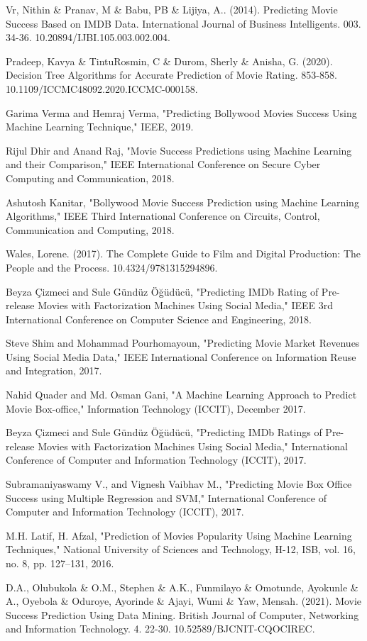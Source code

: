 \documentclass[conference]{IEEEtran}
\begin{document}
\begin{thebibliography}{1}
    Vr, Nithin \& Pranav, M \& Babu, PB \& Lijiya, A.. (2014). Predicting Movie Success Based on IMDB Data. International Journal of Business Intelligents. 003. 34-36. 10.20894/IJBI.105.003.002.004.

    Pradeep, Kavya \& TintuRosmin, C \& Durom, Sherly \& Anisha, G. (2020). Decision Tree Algorithms for Accurate Prediction of Movie Rating. 853-858. 10.1109/ICCMC48092.2020.ICCMC-000158.

    Garima Verma and Hemraj Verma, "Predicting Bollywood Movies Success Using Machine Learning Technique," IEEE, 2019.

    Rijul Dhir and Anand Raj, "Movie Success Predictions using Machine Learning and their Comparison," IEEE International Conference on Secure Cyber Computing and Communication, 2018.

    Ashutosh Kanitar, "Bollywood Movie Success Prediction using Machine Learning Algorithms," IEEE Third International Conference on Circuits, Control, Communication and Computing, 2018.

    Wales, Lorene. (2017). The Complete Guide to Film and Digital Production: The People and the Process. 10.4324/9781315294896.

    Beyza Çizmeci and Sule Gündüz Öğüdücü, "Predicting IMDb Rating of Pre-release Movies with Factorization Machines Using Social Media," IEEE 3rd International Conference on Computer Science and Engineering, 2018.

    Steve Shim and Mohammad Pourhomayoun, "Predicting Movie Market Revenues Using Social Media Data," IEEE International Conference on Information Reuse and Integration, 2017.

    Nahid Quader and Md. Osman Gani, "A Machine Learning Approach to Predict Movie Box-office," Information Technology (ICCIT), December 2017.

    Beyza Çizmeci and Sule Gündüz Öğüdücü, "Predicting IMDb Ratings of Pre-release Movies with Factorization Machines Using Social Media," International Conference of Computer and Information Technology (ICCIT), 2017.

    Subramaniyaswamy V., and Vignesh Vaibhav M., "Predicting Movie Box Office Success using Multiple Regression and SVM," International Conference of Computer and Information Technology (ICCIT), 2017.

    M.H. Latif, H. Afzal, "Prediction of Movies Popularity Using Machine Learning Techniques," National University of Sciences and Technology, H-12, ISB, vol. 16, no. 8, pp. 127–131, 2016.

    D.A., Olubukola \& O.M., Stephen \& A.K., Funmilayo \& Omotunde, Ayokunle \& A., Oyebola \& Oduroye, Ayorinde \& Ajayi, Wumi \& Yaw, Mensah. (2021). Movie Success Prediction Using Data Mining. British Journal of Computer, Networking and Information Technology. 4. 22-30. 10.52589/BJCNIT-CQOCIREC.

\end{thebibliography}
\end{document}
